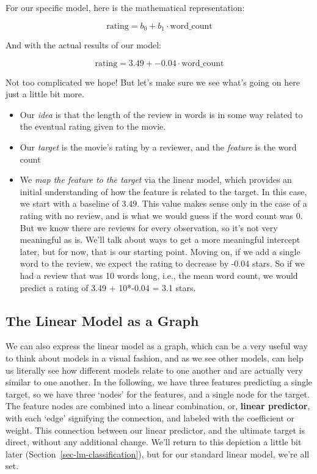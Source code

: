 \documentclass[
  letterpaper,
]{krantz}
\providecommand{\tightlist}{%
  \setlength{\itemsep}{0pt}\setlength{\parskip}{0pt}}\usepackage{longtable,booktabs,array}
\begin{document}
For our specific model, here is the mathematical representation:

\[
\textrm{rating} = b_0 + b_1 \cdot \textrm{word\_count}
\]

And with the actual results of our model:

\[
\textrm{rating} = 3.49 + -0.04 \cdot \textrm{word\_count}
\]

Not too complicated we hope! But let's make sure we see what's going on
here just a little bit more.

\begin{itemize}
\tightlist
\item
  Our \emph{idea} is that the length of the review in words is in some
  way related to the eventual rating given to the movie.
\item
  Our \emph{target} is the movie's rating by a reviewer, and the
  \emph{feature} is the word count
\item
  We \emph{map the feature to the target} via the linear model, which
  provides an initial understanding of how the feature is related to the
  target. In this case, we start with a baseline of 3.49. This value
  makes sense only in the case of a rating with no review, and is what
  we would guess if the word count was 0. But we know there are reviews
  for every observation, so it's not very meaningful as is. We'll talk
  about ways to get a more meaningful intercept later, but for now, that
  is our starting point. Moving on, if we add a single word to the
  review, we expect the rating to decrease by -0.04 stars. So if we had
  a review that was 10 words long, i.e., the mean word count, we would
  predict a rating of 3.49 + 10*-0.04 = 3.1 stars.
\end{itemize}

\subsection{The Linear Model as a Graph}\label{sec-lm-graph}

We can also express the linear model as a graph, which can be a very
useful way to think about models in a visual fashion, and as we see
other models, can help us literally see how different models relate to
one another and are actually very similar to one another. In the
following, we have three features predicting a single target, so we have
three `nodes' for the features, and a single node for the target. The
feature nodes are combined into a linear combination, or, \textbf{linear
predictor}, with each `edge' signifying the connection, and labeled with
the coefficient or weight. This connection between our linear predictor,
and the ultimate target is direct, without any additional change. We'll
return to this depiction a little bit later
(Section~\ref{sec-lm-classification}), but for our standard linear
model, we're all set.
\end{document}
